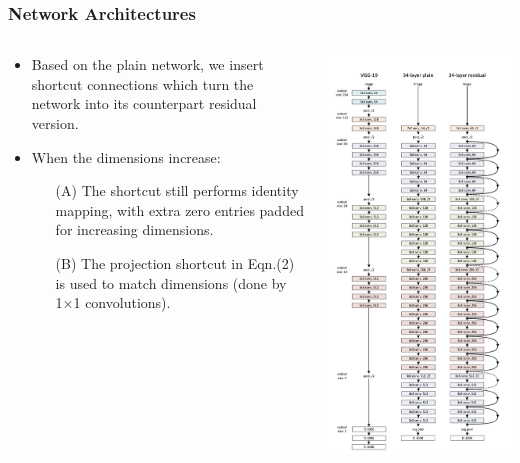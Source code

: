 \documentclass[
	11pt, %
]{beamer}
\begin{document}
\begin{frame}
	\frametitle{Network Architectures}
	
	\begin{columns}
		\begin{column}{0.5\textwidth}
			\begin{itemize}
				\item Based on the plain network, we insert shortcut connections which turn the network into its counterpart residual version.
				\item When the dimensions increase: 
				\begin{itemize}
					\item[(A)] The shortcut still performs identity mapping, with extra zero entries padded for increasing dimensions.
					\item[(B)] The projection shortcut in Eqn.(2) is used to match dimensions (done by 1×1 convolutions).
				\end{itemize}
			\end{itemize}
		\end{column}
		\begin{column}{0.6\textwidth}
			\centering
			\includegraphics[width=0.5\linewidth]{./images/Screenshot 2025-05-20 at 0.25.50.png} %
		\end{column}
	\end{columns}
\end{frame}
\end{document}
